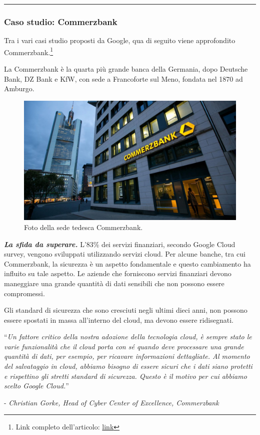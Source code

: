 \documentclass[a4paper]{article}
\newcommand{\longline}{\noindent\rule{\textwidth}{0.4pt}}
\newcommand{\dquotes}[1]{``#1''}
\begin{document}
	\longline
	
	\subsubsection{Caso studio: Commerzbank}
	
	Tra i vari casi studio proposti da Google, qua di seguito viene approfondito Commerzbank.\footnote{Link completo dell'articolo: \href{https://cloud.google.com/customers/commerzbankag}{link}}\newline
	
	\noindent
	La Commerzbank è la quarta più grande banca della Germania, dopo Deutsche Bank, DZ Bank e KfW, con sede a Francoforte sul Meno, fondata nel 1870 ad Amburgo.
	\begin{figure}[!htp]
		\centering
		\includegraphics[width=\textwidth]{img/Googe-2.jpg}
		\caption{Foto della sede tedesca Commerzbank.}
	\end{figure}\newpage
	
	\noindent
	\textbf{\emph{La sfida da superare.}} L'83\% dei servizi finanziari, secondo Google Cloud survey, vengono sviluppati utilizzando servizi cloud. Per alcune banche, tra cui Commerzbank, la sicurezza è un aspetto fondamentale e questo cambiamento ha influito su tale aspetto. Le aziende che forniscono servizi finanziari devono maneggiare una grande quantità di dati sensibili che non possono essere compromessi.
	
	Gli standard di sicurezza che sono cresciuti negli ultimi dieci anni, non possono essere spostati in massa all'interno del cloud, ma devono essere ridisegnati.
	\begin{center}
		\dquotes{\emph{Un fattore critico della nostra adozione della tecnologia cloud, è sempre stato le varie funzionalità che il cloud porta con sé quando deve processare una grande quantità di dati, per esempio, per ricavare informazioni dettagliate. Al momento del salvataggio in cloud, abbiamo bisogno di essere sicuri che i dati siano protetti e rispettino gli stretti standard di sicurezza. Questo è il motivo per cui abbiamo scelto Google Cloud.}}\newline
		
		\noindent
		- \emph{Christian Gorke, Head of Cyber Center of Excellence, Commerzbank}
	\end{center}\:\newline
	
\end{document}

